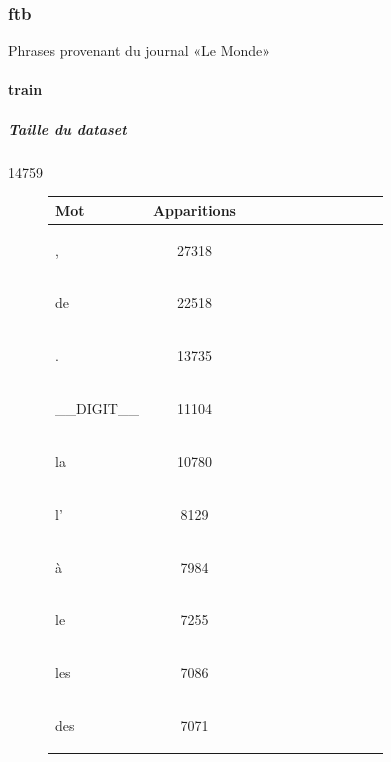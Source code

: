\subsubsection{ftb} 
 Phrases provenant du journal «Le Monde»\paragraph{train}
\subparagraph{Taille du dataset}14759
\begin{figure}[H] \begin{minipage}{0.48\textwidth} \centering \begin{tabular}{|l || *{11 }{|c} |} \hline
Mot & Apparitions  \\ \hline
\begin{verb} , \end{verb} &27318\\ \hline
\begin{verb} de \end{verb} &22518\\ \hline
\begin{verb} . \end{verb} &13735\\ \hline
\begin{verb} __DIGIT__ \end{verb} &11104\\ \hline
\begin{verb} la \end{verb} &10780\\ \hline
\begin{verb} l' \end{verb} &8129\\ \hline
\begin{verb} à \end{verb} &7984\\ \hline
\begin{verb} le \end{verb} &7255\\ \hline
\begin{verb} les \end{verb} &7086\\ \hline
\begin{verb} des \end{verb} &7071\\ \hline


\end{tabular}
\end{minipage}
\end{figure}
